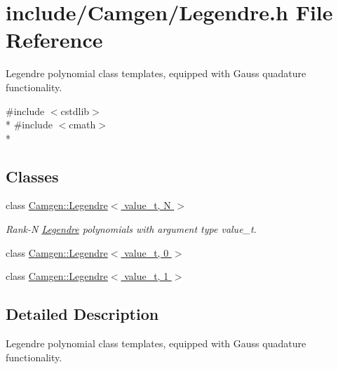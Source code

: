 \hypertarget{a00677}{}\section{include/\+Camgen/\+Legendre.h File Reference}
\label{a00677}


Legendre polynomial class templates, equipped with Gauss quadature functionality.  


{\ttfamily \#include $<$cstdlib$>$}\\*
{\ttfamily \#include $<$cmath$>$}\\*
\subsection*{Classes}
\begin{DoxyCompactItemize}
\item 
class \hyperlink{a00323}{Camgen\+::\+Legendre$<$ value\+\_\+t, N $>$}
\begin{DoxyCompactList}\small\item\em Rank-\/\+N \hyperlink{a00323}{Legendre} polynomials with argument type value\+\_\+t. \end{DoxyCompactList}\item 
class \hyperlink{a00324}{Camgen\+::\+Legendre$<$ value\+\_\+t, 0 $>$}
\item 
class \hyperlink{a00325}{Camgen\+::\+Legendre$<$ value\+\_\+t, 1 $>$}
\end{DoxyCompactItemize}


\subsection{Detailed Description}
Legendre polynomial class templates, equipped with Gauss quadature functionality. 

